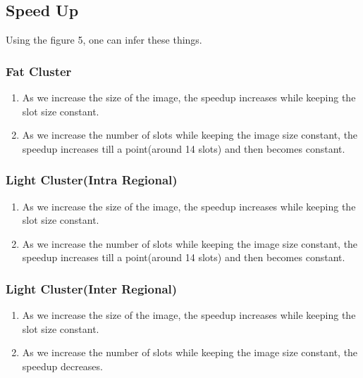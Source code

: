 \documentclass{article}
\begin{document}
\subsection{Speed Up}
Using the figure 5, one can infer these things.
\subsubsection{Fat Cluster}
\begin{enumerate}
    \item As we increase the size of the image, the speedup increases while keeping the slot size constant.
    \item  As we increase the number of slots while keeping the image size constant, the speedup increases till a point(around 14 slots) and then becomes constant.
\end{enumerate}
\subsubsection{Light Cluster(Intra Regional)}
\begin{enumerate}
    \item As we increase the size of the image, the speedup increases while keeping the slot size constant.
    \item  As we increase the number of slots while keeping the image size constant, the speedup increases till a point(around 14 slots) and then becomes constant.
\end{enumerate}
\subsubsection{Light Cluster(Inter Regional)}
\begin{enumerate}
    \item As we increase the size of the image, the speedup increases while keeping the slot size constant.
    \item As we increase the number of slots while keeping the image size constant, the speedup decreases.
\end{enumerate}
\end{document}
